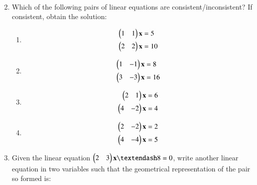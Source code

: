 \begin{enumerate}[label=\arabic*.,ref=\thesubsection.\theenumi]
\begin{enumerate}[itemsep=2pt]
\begin{align}
\begin{split}
\end{split}
\end{align}
\end{enumerate}
%
\item Which of the following pairs of linear equations are consistent/inconsistent? If consistent, obtain the solution:
%
\begin{enumerate}[itemsep=2pt]
\item
\begin{align}
\begin{split}
\begin{pmatrix}1 & 1 \end{pmatrix}\mathbf{x}&=5
\\
\begin{pmatrix}2 & 2 \end{pmatrix}\mathbf{x}&=10
\end{split}
\end{align}
\item
\begin{align}
\begin{split}
\begin{pmatrix}1 & -1 \end{pmatrix}\mathbf{x}&=8
\\
\begin{pmatrix}3 & -3 \end{pmatrix}\mathbf{x}&=16
\end{split}
\end{align}
\item
\begin{align}
\begin{split}
\begin{pmatrix}2 & 1 \end{pmatrix}\mathbf{x}&=6
\\
\begin{pmatrix}4 & -2 \end{pmatrix}\mathbf{x}&=4
\end{split}
\end{align}
\item
\begin{align}
\begin{split}
\begin{pmatrix}2 & -2 \end{pmatrix}\mathbf{x}&=2
\\
\begin{pmatrix}4 & -4 \end{pmatrix}\mathbf{x}&=5
\end{split}
\end{align}
\end{enumerate}
%
\item Given the linear equation $\myvec{2 & 3}\vec{x} – 8 = 0$, write another linear equation in two variables such that the geometrical representation of the pair so formed is: 
%
\begin{enumerate}[itemsep=2pt]

\end{enumerate}
\end{enumerate}
